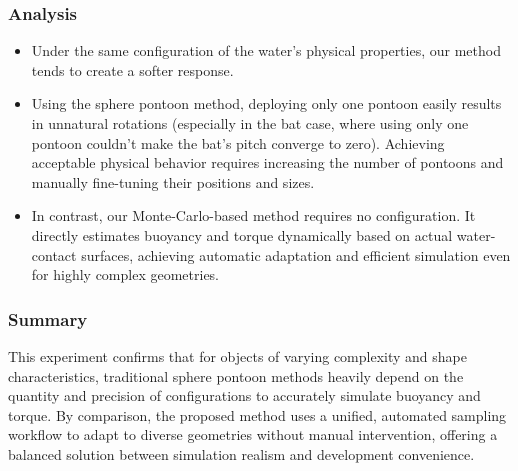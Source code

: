 \subsubsection*{Analysis}

\begin{itemize}
	\item Under the same configuration of the water's physical properties, our method tends to create a softer response.
	\item Using the sphere pontoon method, deploying only one pontoon easily results in unnatural rotations (especially in the bat case, where using only one pontoon couldn't make the bat's pitch converge to zero). Achieving acceptable physical behavior requires increasing the number of pontoons and manually fine-tuning their positions and sizes.
	\item In contrast, our Monte-Carlo-based method requires no configuration. It directly estimates buoyancy and torque dynamically based on actual water-contact surfaces, achieving automatic adaptation and efficient simulation even for highly complex geometries.
\end{itemize}

\subsubsection*{Summary}

This experiment confirms that for objects of varying complexity and shape characteristics, traditional sphere pontoon methods heavily depend on the quantity and precision of configurations to accurately simulate buoyancy and torque.  
By comparison, the proposed method uses a unified, automated sampling workflow to adapt to diverse geometries without manual intervention, offering a balanced solution between simulation realism and development convenience.